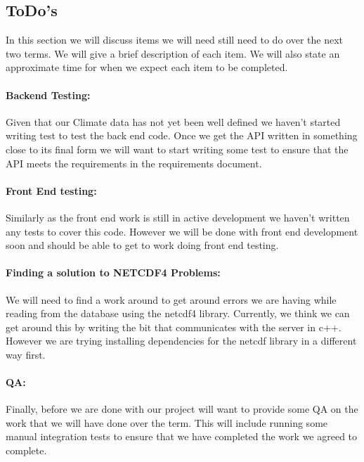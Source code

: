 \documentclass[onecolumn, draftclsnofoot,10pt, compsoc]{article}
\begin{document}
	\subsection{ToDo's}
	    In this section we will discuss items we will need still need to do over the next two terms. We will give a brief description of each item. We will also state an approximate time for when we expect each item to be completed.\\
			
			\paragraph{Backend Testing:} Given that our Climate data has not yet been well defined we haven't started writing test to test the back end code. Once we get the API written in something close to its final form we will want to start writing some test to ensure that the API meets the requirements in the requirements document.\\
			
			\paragraph{Front End testing:} Similarly as the front end work is still in active development we haven’t written any tests to cover this code. However we will be done with front end development soon and should be able to get to work doing front end testing.\\
			
			\paragraph{Finding a solution to NETCDF4 Problems:} We will need to find a work around to get around errors we are having while reading from the database using the netcdf4 library. Currently, we think we can get around this by writing the bit that communicates with the server in c++. However we are trying installing dependencies for the netcdf library in a different way first.\\
			
			\paragraph{QA:} Finally, before we are done with our project will want to provide some QA on the work that we will have done over the term. This will include running some manual integration tests to ensure that we have completed the work we agreed to complete.\\
	    
\end{document}

